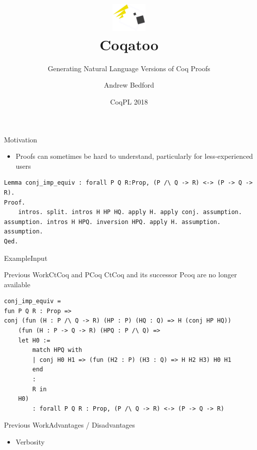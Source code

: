\documentclass[pdf]{beamer}
\title[Coqatoo]{\includegraphics[width=50pt]{images/logo.png}\\Coqatoo}
\subtitle{Generating Natural Language Versions of Coq Proofs}
\author{Andrew Bedford}
\institute{Laval University}
\date{CoqPL 2018}
\begin{document}
\begin{frame}
    \titlepage
\end{frame}

\begin{frame}[fragile]{Motivation}
\begin{itemize}
    \item Proofs can sometimes be hard to understand, particularly for less-experienced users
\end{itemize}
\begin{adjustbox}{minipage=\linewidth,bgcolor=coqatoo-gray,trim=-3pt 5pt -3pt 5pt}        
\begin{lstlisting}[label=listing:input]
Lemma conj_imp_equiv : forall P Q R:Prop, (P /\ Q -> R) <-> (P -> Q -> R).
Proof.
    intros. split. intros H HP HQ. apply H. apply conj. assumption. assumption. intros H HPQ. inversion HPQ. apply H. assumption. assumption.
Qed.
\end{lstlisting}
\end{adjustbox}
\end{frame}

\begin{frame}[fragile]{Example}{Input}

\end{frame}

\begin{frame}[fragile]{Previous Work}{CtCoq and PCoq}
CtCoq and its successor Pcoq are no longer available
\begin{adjustbox}{minipage=\linewidth,bgcolor=coqatoo-gray,trim=-3pt 5pt -3pt 5pt}            
\begin{lstlisting}
conj_imp_equiv = 
fun P Q R : Prop =>
conj (fun (H : P /\ Q -> R) (HP : P) (HQ : Q) => H (conj HP HQ))
    (fun (H : P -> Q -> R) (HPQ : P /\ Q) =>
    let H0 :=
        match HPQ with
        | conj H0 H1 => (fun (H2 : P) (H3 : Q) => H H2 H3) H0 H1
        end
        :
        R in
    H0)
        : forall P Q R : Prop, (P /\ Q -> R) <-> (P -> Q -> R)
\end{lstlisting}
\end{adjustbox}
\end{frame}

\begin{frame}{Previous Work}{Advantages / Disadvantages}
    \begin{itemize}
    \item Verbosity
\end{itemize}
\end{frame}
\end{document}
